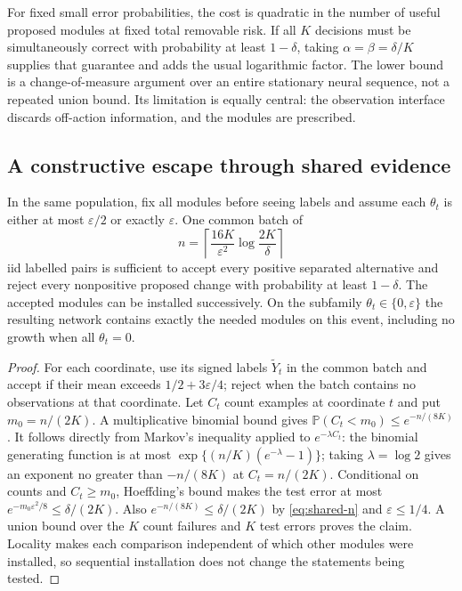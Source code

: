 For fixed small error probabilities, the cost is quadratic in the number
of useful proposed modules at fixed total removable risk. If all $K$
decisions must be simultaneously correct with probability at least
$1-\delta$, taking $\alpha=\beta=\delta/K$ supplies that guarantee and
adds the usual logarithmic factor. The lower bound is a change-of-measure
argument over an entire stationary neural sequence, not a repeated union
bound. Its limitation is equally central: the observation interface
discards off-action information, and the modules are prescribed.

\subsection{A constructive escape through shared evidence}

\begin{theorem}
\label{thm:shared-evidence}
In the same population, fix all modules before seeing labels and assume
each $\theta_t$ is either at most $\varepsilon/2$ or exactly $\varepsilon$.
One common batch of
\begin{equation}
 n=\left\lceil\frac{16K}{\varepsilon^2}\log\frac{2K}{\delta}\right\rceil
 \label{eq:shared-n}
\end{equation}
iid labelled pairs is sufficient to accept every positive separated
alternative and reject every nonpositive proposed change with probability
at least $1-\delta$. The accepted modules can be installed successively.
On the subfamily $\theta_t\in\{0,\varepsilon\}$ the resulting network
contains exactly the needed modules on this event, including no growth
when all $\theta_t=0$.
\end{theorem}
\begin{proof}
For each coordinate, use its signed labels $\widetilde Y_t$ in the common
batch and accept if their mean exceeds $1/2+3\varepsilon/4$; reject when
the batch contains no observations at that coordinate.
Let $C_t$ count examples at coordinate
$t$ and put $m_0=n/(2K)$. A multiplicative binomial bound gives
$\mathbb P(C_t<m_0)\le e^{-n/(8K)}$.
It follows directly from Markov's inequality applied to
$e^{-\lambda C_t}$: the binomial generating function is at most
$\exp\{(n/K)(e^{-\lambda}-1)\}$; taking $\lambda=\log2$ gives
an exponent no greater than $-n/(8K)$ at $C_t=n/(2K)$.
Conditional on counts and $C_t\ge m_0$, Hoeffding's bound makes the
test error at most
$e^{-m_0\varepsilon^2/8}\le\delta/(2K)$.
Also $e^{-n/(8K)}\le\delta/(2K)$ by \eqref{eq:shared-n} and
$\varepsilon\le1/4$. A union bound over the $K$ count failures and $K$
test errors proves the claim. Locality makes each comparison independent
of which other modules were installed, so sequential installation does
not change the statements being tested.
\end{proof}


